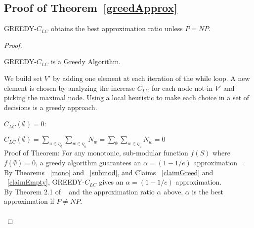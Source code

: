 \subsection{Proof of Theorem~\ref{greedApprox}}
GREEDY-$C_{LC}$ obtains the best approximation ratio unless $P = NP$.\\
\begin{proof}
\begin{Claim}\label{claimGreed} GREEDY-$C_{LC}$ is a Greedy Algorithm. \end{Claim}

We build set $V'$ by adding one element at each iteration of the while loop.  A new element is chosen by analyzing the increase $C_{LC}$ for each node not in $V'$ and picking the maximal node. Using a local heuristic to make each choice in a set of decisions is a greedy approach. \\

\begin{Claim}\label{claimEmpty} $C_{LC}(\emptyset) = 0$: \end{Claim}

$C_{LC}(\emptyset) = \sum_{u \in \eta_\emptyset} \sum_{w \in \eta_u} N_w = \sum_{\emptyset} \sum_{w \in \eta_u} N_w = 0$\\

Proof of Theorem: For any monotonic, sub-modular function $f(S)$ where $f(\emptyset) = 0$, a greedy algorithm guarantees an $\alpha = (1-1/e)$ approximation ~\cite{nemhauser78}. By Theorems ~\ref{mono} and ~\ref{submod}, and Claims ~\ref{claimGreed} and ~\ref{claimEmpty}, GREEDY-$C_{LC}$ gives an $\alpha = (1-1/e)$ approximation.\\

By Theorem 2.1 of ~\cite{kleinberg} and the approximation ratio $\alpha$ above, $\alpha$ is the best approximation if $P \neq NP$. \\ \\  \end{proof}


